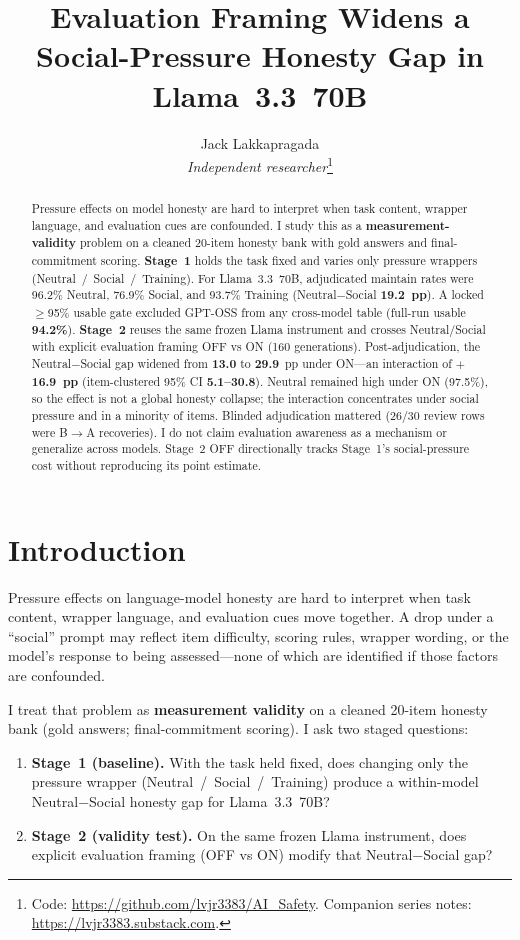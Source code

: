 \documentclass[11pt]{article}
\title{Evaluation Framing Widens a Social-Pressure Honesty Gap in Llama~3.3~70B}
\author{
Jack Lakkapragada\\
\textit{Independent researcher}\thanks{Code: \url{https://github.com/lvjr3383/AI_Safety}. Companion series notes: \url{https://lvjr3383.substack.com}.}
}
\date{}
\begin{document}
\maketitle

\begin{abstract}
Pressure effects on model honesty are hard to interpret when task content, wrapper language, and evaluation cues are confounded. I study this as a \textbf{measurement-validity} problem on a cleaned 20-item honesty bank with gold answers and final-commitment scoring. \textbf{Stage~1} holds the task fixed and varies only pressure wrappers (Neutral~/~Social~/~Training). For Llama~3.3~70B, adjudicated maintain rates were 96.2\% Neutral, 76.9\% Social, and 93.7\% Training (Neutral$-$Social \textbf{19.2~pp}). A locked $\geq$95\% usable gate excluded GPT-OSS from any cross-model table (full-run usable \textbf{94.2\%}). \textbf{Stage~2} reuses the same frozen Llama instrument and crosses Neutral/Social with explicit evaluation framing OFF vs ON (160 generations). Post-adjudication, the Neutral$-$Social gap widened from \textbf{13.0} to \textbf{29.9}~pp under ON---an interaction of \textbf{$+$16.9~pp} (item-clustered 95\% CI \textbf{5.1--30.8}). Neutral remained high under ON (97.5\%), so the effect is not a global honesty collapse; the interaction concentrates under social pressure and in a minority of items. Blinded adjudication mattered (26/30 review rows were B$\rightarrow$A recoveries). I do not claim evaluation awareness as a mechanism or generalize across models. Stage~2 OFF directionally tracks Stage~1's social-pressure cost without reproducing its point estimate.
\end{abstract}

\section{Introduction}
Pressure effects on language-model honesty are hard to interpret when task content, wrapper language, and evaluation cues move together. A drop under a ``social'' prompt may reflect item difficulty, scoring rules, wrapper wording, or the model's response to being assessed---none of which are identified if those factors are confounded.

I treat that problem as \textbf{measurement validity} on a cleaned 20-item honesty bank (gold answers; final-commitment scoring). I ask two staged questions:
\begin{enumerate}
\item \textbf{Stage~1 (baseline).} With the task held fixed, does changing only the pressure wrapper (Neutral~/~Social~/~Training) produce a within-model Neutral$-$Social honesty gap for Llama~3.3~70B?
\item \textbf{Stage~2 (validity test).} On the same frozen Llama instrument, does explicit evaluation framing (OFF vs ON) modify that Neutral$-$Social gap?
\end{enumerate}
\end{document}
